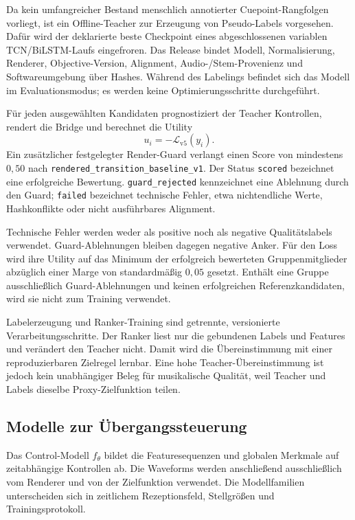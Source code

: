 Da kein umfangreicher Bestand menschlich annotierter Cuepoint-Rangfolgen vorliegt, ist ein Offline-Teacher zur Erzeugung von Pseudo-Labels vorgesehen. Dafür wird der deklarierte beste Checkpoint eines abgeschlossenen variablen TCN/BiLSTM-Laufs eingefroren. Das Release bindet Modell, Normalisierung, Renderer, Objective-Version, Alignment, Audio-/Stem-Provenienz und Softwareumgebung über Hashes. Während des Labelings befindet sich das Modell im Evaluationsmodus; es werden keine Optimierungsschritte durchgeführt.

Für jeden ausgewählten Kandidaten prognostiziert der Teacher Kontrollen, rendert die Bridge und berechnet die Utility
\begin{equation}
 u_i=-\mathcal{L}_{\mathrm{v5}}(y_i).
\end{equation}
Ein zusätzlicher festgelegter Render-Guard verlangt einen Score von mindestens $0{,}50$ nach \texttt{rendered\_transition\_baseline\_v1}. Der Status \texttt{scored} bezeichnet eine erfolgreiche Bewertung. \texttt{guard\_rejected} kennzeichnet eine Ablehnung durch den Guard; \texttt{failed} bezeichnet technische Fehler, etwa nichtendliche Werte, Hashkonflikte oder nicht ausführbares Alignment.

Technische Fehler werden weder als positive noch als negative Qualitätslabels verwendet. Guard-Ablehnungen bleiben dagegen negative Anker. Für den Loss wird ihre Utility auf das Minimum der erfolgreich bewerteten Gruppenmitglieder abzüglich einer Marge von standardmäßig $0{,}05$ gesetzt. Enthält eine Gruppe ausschließlich Guard-Ablehnungen und keinen erfolgreichen Referenzkandidaten, wird sie nicht zum Training verwendet.

Labelerzeugung und Ranker-Training sind getrennte, versionierte Verarbeitungsschritte. Der Ranker liest nur die gebundenen Labels und Features und verändert den Teacher nicht. Damit wird die Übereinstimmung mit einer reproduzierbaren Zielregel lernbar. Eine hohe Teacher-Übereinstimmung ist jedoch kein unabhängiger Beleg für musikalische Qualität, weil Teacher und Labels dieselbe Proxy-Zielfunktion teilen.

\subsection{Modelle zur Übergangssteuerung}
\label{sec:methodik-controller}

Das Control-Modell $f_\theta$ bildet die Featuresequenzen und globalen Merkmale auf zeitabhängige Kontrollen ab. Die Waveforms werden anschließend ausschließlich vom Renderer und von der Zielfunktion verwendet. Die Modellfamilien unterscheiden sich in zeitlichem Rezeptionsfeld, Stellgrößen und Trainingsprotokoll.

